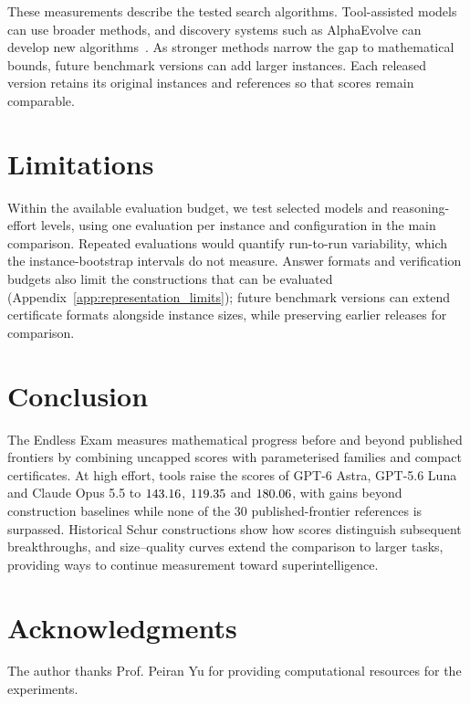 \documentclass{article}
\begin{document}
These measurements describe the tested search algorithms. Tool-assisted models can use broader methods, and discovery systems such as AlphaEvolve can develop new algorithms~\citep{georgiev2025exploration}. As stronger methods narrow the gap to mathematical bounds, future benchmark versions can add larger instances. Each released version retains its original instances and references so that scores remain comparable.



\FloatBarrier
\section{Limitations}
\label{sec:limitations}
Within the available evaluation budget, we test selected models and reasoning-effort levels, using one evaluation per instance and configuration in the main comparison. Repeated evaluations would quantify run-to-run variability, which the instance-bootstrap intervals do not measure. Answer formats and verification budgets also limit the constructions that can be evaluated (Appendix~\ref{app:representation_limits}); future benchmark versions can extend certificate formats alongside instance sizes, while preserving earlier releases for comparison.

\section{Conclusion}
The Endless Exam measures mathematical progress before and beyond published frontiers by combining uncapped scores with parameterised families and compact certificates. At high effort, tools raise the scores of GPT-6 Astra, GPT-5.6 Luna and Claude Opus 5.5 to $143.16$, $119.35$ and $180.06$, with gains beyond construction baselines while none of the 30 published-frontier references is surpassed. Historical Schur constructions show how scores distinguish subsequent breakthroughs, and size--quality curves extend the comparison to larger tasks, providing ways to continue measurement toward superintelligence.
\par
\label{page:mainend}

\clearpage
\ifdefined\EndlessExamPreprint
\section*{Acknowledgments}
The author thanks Prof. Peiran Yu for providing computational resources for the experiments.
\fi
\end{document}
